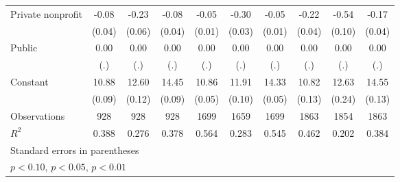 \begin{table}[htbp]
\begin{adjustbox}{center}
\begin{tabular}{l*{9}{c}}
Private nonprofit   &       -0.08\sym{**} &       -0.23\sym{***}&       -0.08\sym{**} &       -0.05\sym{***}&       -0.30\sym{***}&       -0.05\sym{***}&       -0.22\sym{***}&       -0.54\sym{***}&       -0.17\sym{***}\\
                    &      (0.04)         &      (0.06)         &      (0.04)         &      (0.01)         &      (0.03)         &      (0.01)         &      (0.04)         &      (0.10)         &      (0.04)         \\
Public              &        0.00         &        0.00         &        0.00         &        0.00         &        0.00         &        0.00         &        0.00         &        0.00         &        0.00         \\
                    &         (.)         &         (.)         &         (.)         &         (.)         &         (.)         &         (.)         &         (.)         &         (.)         &         (.)         \\
Constant            &       10.88\sym{***}&       12.60\sym{***}&       14.45\sym{***}&       10.86\sym{***}&       11.91\sym{***}&       14.33\sym{***}&       10.82\sym{***}&       12.63\sym{***}&       14.55\sym{***}\\
                    &      (0.09)         &      (0.12)         &      (0.09)         &      (0.05)         &      (0.10)         &      (0.05)         &      (0.13)         &      (0.24)         &      (0.13)         \\
\midrule
Observations        &         928         &         928         &         928         &        1699         &        1659         &        1699         &        1863         &        1854         &        1863         \\
\(R^{2}\)           &       0.388         &       0.276         &       0.378         &       0.564         &       0.283         &       0.545         &       0.462         &       0.202         &       0.384         \\
\bottomrule
\multicolumn{10}{l}{\footnotesize Standard errors in parentheses}\\
\multicolumn{10}{l}{\footnotesize \sym{*} \(p<0.10\), \sym{**} \(p<0.05\), \sym{***} \(p<0.01\)}\\
\end{tabular}
\end{adjustbox}
\end{table}
